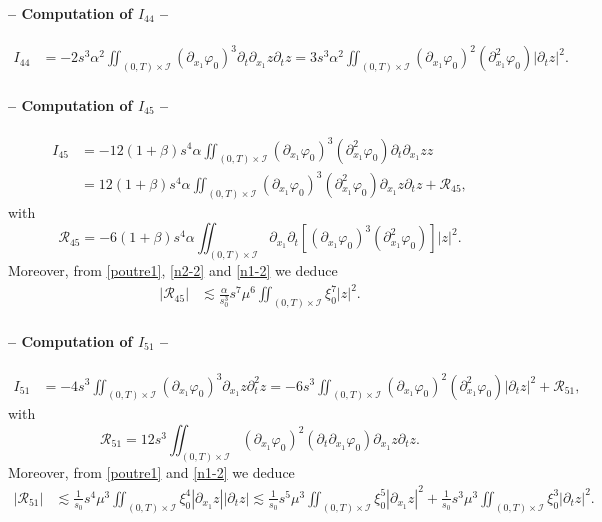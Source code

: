 \documentclass[a4paper, 12pt]{article}
\theoremstyle{plain}
\theoremstyle{definition}
\numberwithin{theorem}{section}
\numberwithin{equation}{section}
\begin{document}
{\paragraph{-- Computation of $I_{44}$ --}
\begin{align*}
I_{44}&=-2s^3\alpha^2\iint_{(0,T)\times\mathcal{I}}(\partial_{x_1}\varphi_0)^3\partial_t\partial_{x_1}z\partial_tz=3s^3\alpha^2\iint_{(0,T)\times\mathcal{I}}(\partial_{x_1}\varphi_0)^2(\partial^2_{x_1}\varphi_0)|\partial_tz|^2.
\end{align*}
\paragraph{-- Computation of $I_{45}$ --}
\begin{align*}
 I_{45}&=-12(1+\beta)s^4\alpha\iint_{(0,T)\times\mathcal{I}}(\partial_{x_1}\varphi_0)^3(\partial^2_{x_1}\varphi_0)\partial_t\partial_{x_1}zz\\
 &=12(1+\beta)s^4\alpha\iint_{(0,T)\times\mathcal{I}}(\partial_{x_1}\varphi_0)^3(\partial^2_{x_1}\varphi_0)\partial_{x_1}z\partial_tz+\mathcal{R}_{45},
\end{align*}
with
$$\mathcal{R}_{45}=-6(1+\beta)s^4\alpha\iint_{(0,T)\times\mathcal{I}}\partial_{x_1}\partial_t[(\partial_{x_1}\varphi_0)^3(\partial^2_{x_1}\varphi_0)]|z|^2.$$
Moreover, from \eqref{poutre1}, \eqref{n2-2} and \eqref{n1-2} we deduce
\begin{align}
 |\mathcal{R}_{45}|&\lesssim \frac{\alpha}{s_0^3}s^7\mu^6\iint_{(0,T)\times\mathcal{I}}\xi_0^7|z|^2.\label{EstR45}
\end{align}
\paragraph{-- Computation of $I_{51}$ --}
\begin{align*}
I_{51}&=-4s^3\iint_{(0,T)\times\mathcal{I}}(\partial_{x_1}\varphi_0)^3\partial_{x_1}z\partial^2_tz=-6s^3\iint_{(0,T)\times\mathcal{I}}(\partial_{x_1}\varphi_0)^2(\partial^2_{x_1}\varphi_0)|\partial_tz|^2+\mathcal{R}_{51},
\end{align*}
with
$$\mathcal{R}_{51}=12s^3\iint_{(0,T)\times\mathcal{I}}(\partial_{x_1}\varphi_0)^2(\partial_t\partial_{x_1}\varphi_0)\partial_{x_1}z\partial_tz.$$
Moreover, from \eqref{poutre1} and \eqref{n1-2} we deduce
\begin{align}
|\mathcal{R}_{51}|&\lesssim \frac{1}{s_0}s^4\mu^3 \iint_{(0,T)\times\mathcal{I}}\xi_0^4|\partial_{x_1}z||\partial_tz|\lesssim \frac{1}{s_0}s^5\mu^3 \iint_{(0,T)\times\mathcal{I}}\xi_0^5|\partial_{x_1}z|^2+\frac{1}{s_0}s^3\mu^3 \iint_{(0,T)\times\mathcal{I}}\xi_0^3|\partial_tz|^2.\label{EstR51}
\end{align}
}
\end{document}
